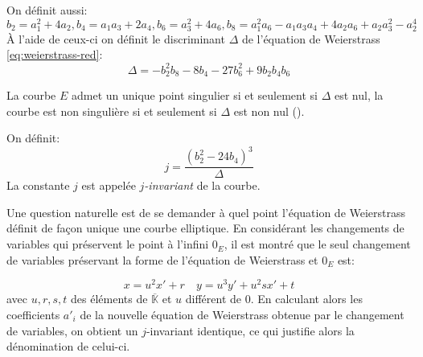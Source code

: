 \documentclass[10pt,a4paper]{book}
\theoremstyle{plain}
\theoremstyle{definition}
\theoremstyle{definition}
\theoremstyle{definition}
\theoremstyle{definition}
\theoremstyle{definition}
\newtheorem{defi}[thm]{Définition}
\theoremstyle{remark}
\theoremstyle{remark}
\theoremstyle{definition}
\begin{document}
 On définit aussi:
\begin{equation*}
b_2=a_1^2+4a_2, b_4=a_1a_3+2a_4, b_6=a_3^2+4a_6, b_8=a_1^2a_6-a_1a_3a_4+4a_2a_6+a_2a_3^2-a_2^4
\end{equation*}
\`A l'aide de ceux-ci on définit le discriminant $\Delta$ de l'équation de Weierstrass \eqref{eq:weierstrass-red}:
\begin{equation*}
\Delta = -b_2^2b_8-8b_4-27b_6^2+9b_2b_4b_6
\end{equation*}

La courbe $E$ admet un unique point singulier si et seulement si $\Delta$ est nul, la courbe est non singulière si et seulement si $\Delta$ est non nul (\cite[Prop. III.1.4]{Silv1}).



On définit: 
\begin{equation*}
j=\frac{(b_2^2-24b_4)^3}{\Delta}
\end{equation*}
La constante $j$ est appelée \emph{$j$-invariant} de la courbe.

Une question naturelle est de se demander à quel point l'équation de 
Weierstrass définit de façon unique une courbe elliptique. En considérant les 
changements de variables qui préservent le point à l'infini $0_E$, il est 
montré \cite[III.3.1b]{Silv1} que le seul changement de variables préservant la
forme de l'équation de Weierstrass et $0_E$ est:

\begin{equation*}
x=u^2x'+r    \quad  y=u^3y'+u^2sx'+t
\end{equation*}
avec $u,r,s,t$ des éléments de $\overline{\mathbb{K}}$ et $u$ différent de $0$. En calculant alors les coefficients $a'_i$ de la nouvelle équation de Weierstrass obtenue par le changement de variables, on obtient un $j$-invariant identique, ce qui justifie alors la dénomination de celui-ci.
\newline
\end{document}
